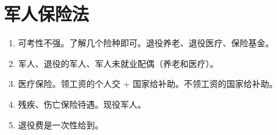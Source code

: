 \section{军人保险法}
\begin{enumerate}
  \item 可考性不强。了解几个险种即可。退役养老、退役医疗、保险基金。
  \item 军人、退役的军人、军人未就业配偶（养老和医疗）。
  \item 医疗保险。领工资的个人交 + 国家给补助。不领工资的国家给补助。
  \item 残疾、伤亡保险待遇。现役军人。
  \item 退役费是一次性给到。
\end{enumerate}